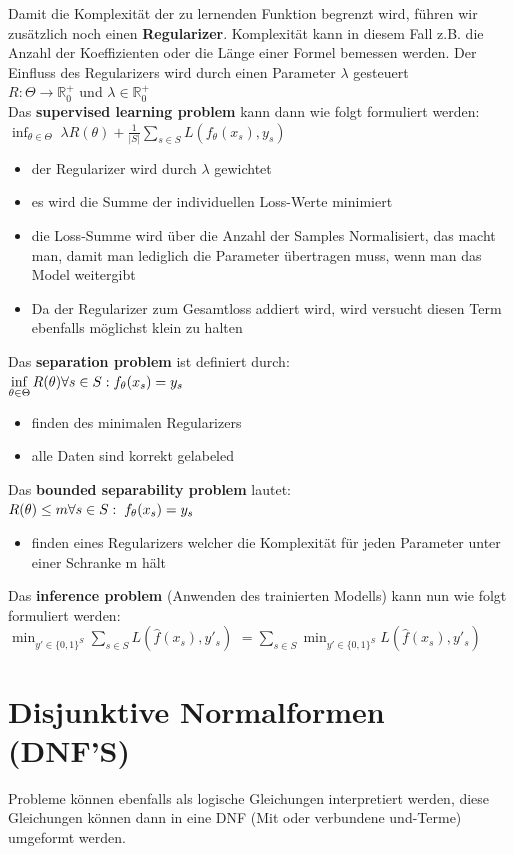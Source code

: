 \documentclass[12pt,a4paper]{article}
\newcommand{\nl}{\\[0.1cm]}
\begin{document}
Damit die Komplexität der zu lernenden Funktion begrenzt wird, führen wir zusätzlich noch einen \textbf{Regularizer}. Komplexität kann in diesem Fall z.B. die Anzahl der Koeffizienten oder die Länge einer Formel bemessen werden. Der Einfluss des Regularizers wird durch einen Parameter $\lambda$ gesteuert\nl
$R: \Theta \rightarrow \mathbb{R}_0^+$ und $\lambda\in\mathbb{R}_0^+$\nl
Das \textbf{supervised learning problem} kann dann wie folgt formuliert werden:\nl
$\displaystyle \inf_{\theta\in\Theta} \; \lambda R(\theta) + \frac{1}{|S|} \sum_{s\in S} L(f_\theta (x_s), y_s)$
\begin{itemize}
\item der Regularizer wird durch $\lambda$ gewichtet
\item es wird die Summe der individuellen Loss-Werte minimiert
\item die Loss-Summe wird über die Anzahl der Samples Normalisiert, das macht man, damit man lediglich die Parameter übertragen muss, wenn man das Model weitergibt
\item Da der Regularizer zum Gesamtloss addiert wird, wird versucht diesen Term ebenfalls möglichst klein zu halten
\end{itemize}
Das \textbf{separation problem} ist definiert durch:\nl
$\displaystyle \inf_{\theta \in \Theta} R(\theta) \\ \forall s\in S: f_\theta(x_s) = y_s$
\begin{itemize}
\item finden des minimalen Regularizers
\item alle Daten sind korrekt gelabeled
\end{itemize}
Das \textbf{bounded separability problem} lautet:\nl
$R(\theta) \leq m \\ \forall s\in S: \; f_\theta(x_s) = y_s$
\begin{itemize}
\item finden eines Regularizers welcher die Komplexität für jeden Parameter unter einer Schranke m hält
\end{itemize}
Das \textbf{inference problem} (Anwenden des trainierten Modells) kann nun wie folgt formuliert werden:\nl
$\displaystyle \min_{y'\in \{0,1\}^S}\sum_{s\in S}L(\hat{f}(x_s),y'_s)$
$\displaystyle = \sum_{s\in S} \min_{y'\in \{0, 1\}^S} L(\hat{f}(x_s),y'_s)$

\section{Disjunktive Normalformen (DNF'S)}
Probleme können ebenfalls als logische Gleichungen interpretiert werden, diese Gleichungen können dann in eine DNF (Mit oder verbundene und-Terme) umgeformt werden.
\end{document}

